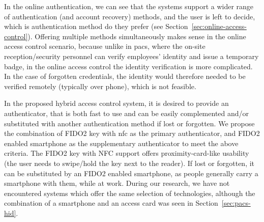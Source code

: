 In the online authentication, we can see that the systems support a wider range of authentication (and account recovery) methods, and the user is left to decide, which is authentication method do they prefer (see Section~\ref{sec:online-access-control}). Offering multiple methods simultaneously makes sense in the online access control scenario, because unlike in \acrshort{pacs}, where the on-site reception/security personnel can verify employees' identity and issue a temporary badge, in the online access control the identity verification is more complicated. In the case of forgotten credentials, the identity would therefore needed to be verified remotely (typically over phone), which is not feasible.

In the proposed hybrid access control system, it is desired to provide an authenticator, that is both fast to use and can be easily complemented and/or substituted with another authentication method if lost or forgotten. We propose the combination of FIDO2 key with \acrshort{nfc} as the primary authenticator, and FIDO2 enabled smartphone as the supplementary authenticator to meet the above criteria. The FIDO2 key with NFC support offers proximity-card-like usability (the user needs to swipe/hold the key next to the reader). If lost or forgotten, it can be substituted by an FIDO2 enabled smartphone, as people generally carry a smartphone with them, while at work. During our research, we have not encountered systems which offer the same selection of technologies, although the combination of a smartphone and an access card was seen in Section~\ref{sec:pacs-hid}.




